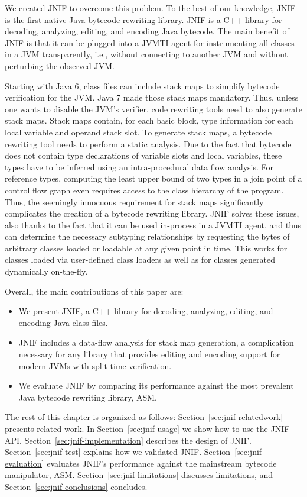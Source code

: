 We created JNIF to overcome this problem. 
To the best of our knowledge, JNIF is the first native Java bytecode rewriting library.
JNIF is a C++ library for decoding, analyzing, editing, and encoding Java bytecode.
The main benefit of JNIF is that it can be plugged into a JVMTI agent 
for instrumenting all classes in a JVM transparently, i.e., 
without connecting to another JVM and without perturbing the observed JVM.

Starting with Java 6, class files can include stack maps to simplify bytecode verification for the JVM.
Java 7 made those stack maps mandatory.
Thus, unless one wants to disable the JVM's verifier,
code rewriting tools need to also generate stack maps.
Stack maps contain, for each basic block,
type information for each local variable and operand stack slot.
To generate stack maps, a bytecode rewriting tool needs to perform a static analysis.
Due to the fact that bytecode does not contain type declarations of variable slots and local variables,
these types have to be inferred using an intra-procedural data flow analysis.
For reference types, 
computing the least upper bound of two types in a join point of a control flow graph 
even requires access to the class hierarchy of the program.
Thus, the seemingly innocuous requirement for stack maps
significantly complicates the creation of a bytecode rewriting library.
JNIF solves these issues, also thanks to the fact that it can be used in-process in a JVMTI agent,
and thus can determine the necessary subtyping relationships 
by requesting the bytes of arbitrary classes loaded or loadable at any given point in time.
This works for classes loaded via user-defined class loaders as well as
for classes generated dynamically on-the-fly.

Overall, the main contributions of this paper are:

\begin{itemize}
	\item We present JNIF, a C++ library for decoding, analyzing, editing, and encoding Java class files.
	\item JNIF includes a data-flow analysis for stack map generation, 
	      a complication necessary for any library that provides editing and encoding support for modern JVMs with split-time verification.
	\item We evaluate JNIF by comparing its performance against the most prevalent Java bytecode rewriting library, ASM.
\end{itemize}

The rest of this chapter is organized as follows:
Section~\ref{sec:jnif-relatedwork} presents related work.
In Section~\ref{sec:jnif-usage} we show how to use the JNIF API.
Section~\ref{sec:jnif-implementation} describes the design of JNIF.
Section~\ref{sec:jnif-test} explains how we validated JNIF.
Section~\ref{sec:jnif-evaluation} evaluates JNIF's performance against the mainstream bytecode manipulator, ASM.
Section~\ref{sec:jnif-limitations} discusses limitations, and 
Section~\ref{sec:jnif-conclusions} concludes.